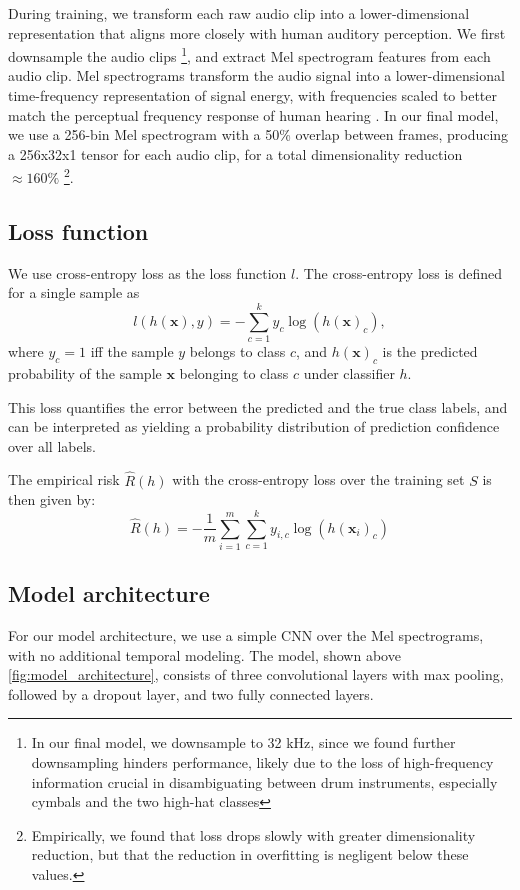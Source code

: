 \documentclass[twocolumn]{article}
\begin{document}
During training, we transform each raw audio clip into a lower-dimensional representation that aligns more closely with human auditory perception.
We first downsample the audio clips \footnote{In our final model, we downsample to 32 kHz, since we found further downsampling hinders performance, likely due to the loss of high-frequency information crucial in disambiguating between drum instruments, especially cymbals and the two high-hat classes},
and extract Mel spectrogram features from each audio clip.
Mel spectrograms transform the audio signal into a lower-dimensional time-frequency representation of signal energy, with frequencies scaled to better match the perceptual frequency response of human hearing \cite{hershey_cnn_2017}.
In our final model, we use a 256-bin Mel spectrogram with a 50\% overlap between frames, producing a 256x32x1 tensor for each audio clip, for a total dimensionality reduction $\approx 160\%$ \footnote{Empirically, we found that loss drops slowly with greater dimensionality reduction, but that the reduction in overfitting is negligent below these values.}.

\subsection{Loss function}
We use cross-entropy loss as the loss function $l$.
The cross-entropy loss is defined for a single sample as
\[l(h(\mathbf{x}), y) = -\sum_{c=1}^k y_c \log(h(\mathbf{x})_c),\]
where $y_c = 1$ iff the sample $y$ belongs to class $c$, and $h(\mathbf{x})_c$ is the predicted probability of the sample $\mathbf{x}$ belonging to class $c$ under classifier \( h \).

This loss quantifies the error between the predicted and the true class labels, and can be interpreted as yielding a probability distribution of prediction confidence over all labels.

The empirical risk \( \hat{R}(h) \) with the cross-entropy loss over the training set \( S \) is then given by:
\[ \hat{R}(h) = -\frac{1}{m} \sum_{i=1}^m \sum_{c=1}^k y_{i,c} \log(h(\mathbf{x}_i)_c) \]

\subsection{Model architecture}

For our model architecture, we use a simple CNN over the Mel spectrograms, with no additional temporal modeling.
The model, shown above \ref{fig:model_architecture}, consists of three convolutional layers with max pooling, followed by a dropout layer, and two fully connected layers.
\end{document}
